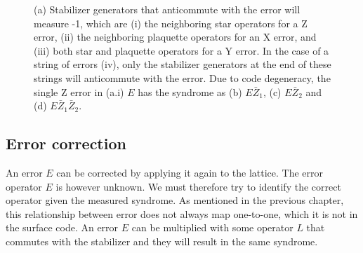 \begin{figure}
  \hspace{1cm}
  \hspace{1cm}
  \caption{(a) Stabilizer generators that anticommute with the error will measure -1, which are (i) the neighboring star operators for a Z error, (ii) the neighboring plaquette operators for an X error, and (iii) both star and plaquette operators for a Y error. In the case of a string of errors (iv), only the stabilizer generators at the end of these strings will anticommute with the error. Due to code degeneracy, the single Z error in (a.i) $E$ has the syndrome as (b) $E\bar{Z}_1$, (c) $E\bar{Z}_2$ and (d) $E\bar{Z}_1\bar{Z}_2$. }\label{sf:fig_degenerate}
\end{figure}

\subsection{Error correction}

An error $E$ can be corrected by applying it again to the lattice. The error operator $E$ is however unknown. We must therefore try to identify the correct operator given the measured syndrome. As mentioned in the previous chapter, this relationship between error does not always map one-to-one, which it is not in the surface code. An error $E$ can be multiplied with some operator $L$ that commutes with the stabilizer and they will result in the same syndrome.

